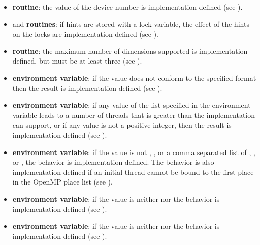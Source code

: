 \begin{itemize}
\item {} \textbf{routine}: the value of
  the device number is implementation defined (see ).

\item {} and  \textbf{routines}: 
if hints are stored with a lock variable, the effect of the hints on the locks are implementation defined (see ).

\item {} \textbf{routine}: 
  the maximum number of dimensions supported is implementation defined, but
  must be at least three (see ).

\item {} \textbf{environment variable}: if the value does not 
conform to the specified format then the result is implementation defined (see 
).

\item {} \textbf{environment variable}: if any value of the list specified in the 
 environment variable leads to a number of threads that is 
greater than the implementation can support, or if any value is not a positive integer, 
then the result is implementation defined (see ).

\item {} \textbf{environment variable}: if the value is not , , or a 
comma separated list of , , or , the behavior is 
implementation defined. The behavior is also implementation defined if an initial 
thread cannot be bound to the first place in the OpenMP place list (see 
).

\item {} \textbf{environment variable}: if the value is neither 
 nor  the behavior is implementation defined (see 
).

\item {} \textbf{environment variable}: if the value is neither 
 nor  the behavior is implementation defined (see 
).


\end{itemize}
